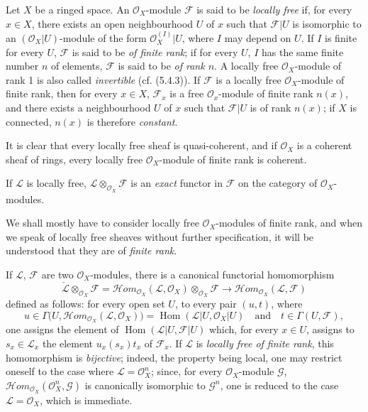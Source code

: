 \begin{env}[5.4.1]
\label{0.5.4.1}
Let $X$ be a ringed space. An $\mathcal{O}_X$-module $\mathcal{F}$
is said to be \emph{locally free} if, for every $x\in X$, there exists an open
neighbourhood $U$ of $x$ such that $\mathcal{F}|U$ is isomorphic to an
$(\mathcal{O}_X|U)$-module of the form $\mathcal{O}_X^{(I)}|U$, where $I$ may
depend on $U$. If $I$ is finite for every $U$, $\mathcal{F}$ is said to be
\emph{of finite rank}; if for every $U$, $I$ has the same finite number $n$
of elements, $\mathcal{F}$ is said to be \emph{of rank $n$}. A
locally free $\mathcal{O}_X$-module of rank 1 is also called
\emph{invertible} (cf. (5.4.3)). If $\mathcal{F}$ is a
locally free $\mathcal{O}_X$-module of finite rank, then for every $x\in X$,
$\mathcal{F}_x$ is a free $\mathcal{O}_x$-module of finite rank $n(x)$, and there
exists a neighbourhood $U$ of $x$ such that $\mathcal{F}|U$ is of rank $n(x)$;
if $X$ is connected, $n(x)$ is therefore \emph{constant}.

It is clear that every locally free sheaf is quasi-coherent, and if
$\mathcal{O}_X$ is a coherent sheaf of rings, every locally free
$\mathcal{O}_X$-module of finite rank is coherent.

If $\mathcal{L}$ is locally free,
$\mathcal{L}\otimes_{\mathcal{O}_X}\mathcal{F}$ is an \emph{exact} functor
in $\mathcal{F}$ on the category of $\mathcal{O}_X$-modules.

We shall mostly have to consider locally free $\mathcal{O}_X$-modules
of finite rank,
and when we speak of locally free sheaves without further specification, it
will be understood that they are of \emph{finite rank}.
\end{env}

\begin{env}[5.4.2]
\label{0.5.4.2}
If $\mathcal{L}$, $\mathcal{F}$ are two $\mathcal{O}_X$-modules, there is a
canonical functorial homomorphism
\[
  \check{\mathcal{L}}\otimes_{\mathcal{O}_X}\mathcal{F}
  =\mathcal{H}\!om_{\mathcal{O}_X}(\mathcal{L},\mathcal{O}_X)
   \otimes_{\mathcal{O}_X}\mathcal{F}
  \longrightarrow
  \mathcal{H}\!om_{\mathcal{O}_X}(\mathcal{L},\mathcal{F})
  \tag{5.4.2.1}\label{0.5.4.2.1}
\]
defined as follows: for every open set $U$, to every pair $(u,t)$, where
\[
  u\in\Gamma\bigl(U,
    \mathcal{H}\!om_{\mathcal{O}_X}(\mathcal{L},\mathcal{O}_X)\bigr)
  =\operatorname{Hom}(\mathcal{L}|U,\mathcal{O}_X|U)
  \quad\text{and}\quad
  t\in\Gamma(U,\mathcal{F}),
\]
one assigns the element of
$\operatorname{Hom}(\mathcal{L}|U,\mathcal{F}|U)$ which, for every $x\in U$,
assigns to $s_x\in\mathcal{L}_x$ the element $u_x(s_x)t_x$ of
$\mathcal{F}_x$. If $\mathcal{L}$ is \emph{locally free of finite rank},
this homomorphism is \emph{bijective}; indeed, the property being local, one may
restrict oneself to the case where $\mathcal{L}=\mathcal{O}_X^n$; since, for every
$\mathcal{O}_X$-module $\mathcal{G}$,
$\mathcal{H}\!om_{\mathcal{O}_X}(\mathcal{O}_X^n,\mathcal{G})$ is
canonically isomorphic to $\mathcal{G}^n$, one is reduced to the case
$\mathcal{L}=\mathcal{O}_X$, which is immediate.
\end{env}

